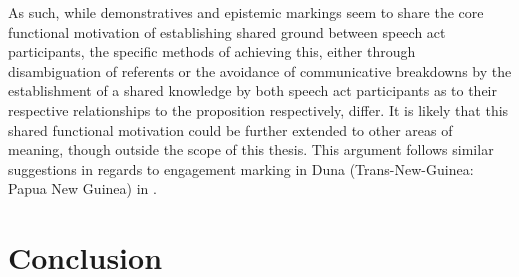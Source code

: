 As such, while demonstratives and epistemic markings seem to share the core functional motivation of establishing shared ground between speech act participants, the specific methods of achieving this, either through disambiguation of referents or the avoidance of communicative breakdowns by the establishment of a shared knowledge by both speech act participants as to their respective relationships to the proposition respectively, differ. It is likely that this shared functional motivation could be further extended to other areas of meaning, though outside the scope of this thesis. This argument follows similar suggestions in regards to engagement marking in Duna (Trans-New-Guinea: Papua New Guinea) in .


\section{Conclusion}
